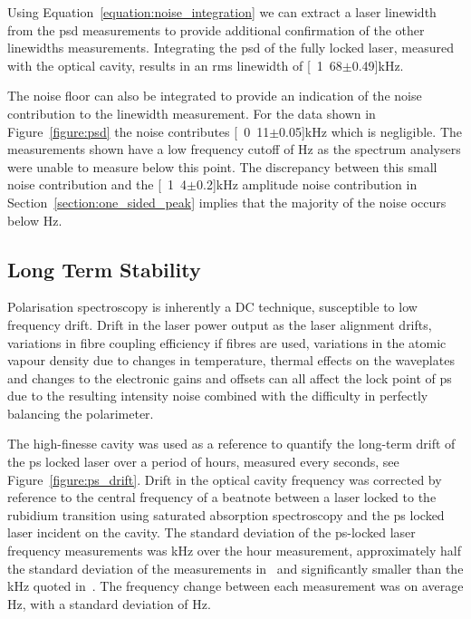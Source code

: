 Using Equation~\ref{equation:noise_integration} we can extract a laser linewidth from the \gls{psd} measurements to provide additional confirmation of the other linewidths measurements.
Integrating the \gls{psd} of the fully locked laser, measured with the optical cavity, results in an \gls{rms} linewidth of \unit[1.68$\pm$0.49]{kHz}.

The noise floor can also be integrated to provide an indication of the noise contribution to the linewidth measurement.
For the data shown in Figure~\ref{figure:psd} the noise contributes \unit[0.11$\pm$0.05]{kHz} which is negligible.
The measurements shown have a low frequency cutoff of \unit[24]{Hz} as the spectrum analysers were unable to measure below this point.
The discrepancy between this small noise contribution and the \unit[1.4$\pm$0.2]{kHz} amplitude noise contribution in Section~\ref{section:one_sided_peak} implies that the majority of the noise occurs below \unit[24]{Hz}.

\subsection{Long Term Stability}

Polarisation spectroscopy is inherently a DC technique, susceptible to low frequency drift.
Drift in the laser power output as the laser alignment drifts, variations in fibre coupling efficiency if fibres are used, variations in the atomic vapour density due to changes in temperature, thermal effects on the waveplates and changes to the electronic gains and offsets can all affect the lock point of \gls{ps} due to the resulting intensity noise combined with the difficulty in perfectly balancing the polarimeter.

The high-finesse cavity was used as a reference to quantify the long-term drift of the \gls{ps} locked laser over a period of \unit[60]{hours}, measured every \unit[10]{seconds}, see Figure~\ref{figure:ps_drift}.
Drift in the optical cavity frequency was corrected by reference to the central frequency of a beatnote between a laser locked to the rubidium transition using saturated absorption spectroscopy and the \gls{ps} locked laser incident on the cavity.
The standard deviation of the \gls{ps}-locked laser frequency measurements was \unit[51]{kHz} over the \unit[60]{hour} measurement, approximately half the standard deviation of the measurements in~\cite{tiwari_laser_2006} and significantly smaller than the \unit[400]{kHz} quoted in~\cite{lee_frequency_2014}.
The frequency change between each measurement was on average \unit[5]{Hz}, with a standard deviation of \unit[210]{Hz}.

